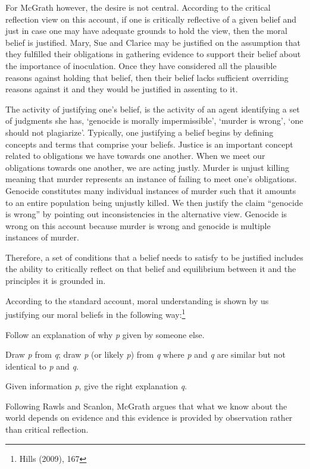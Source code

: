 \documentclass[
  letterpaper,
  DIV=11,
  numbers=noendperiod]{scrartcl}
\theoremstyle{remark}
\begin{document}
For McGrath however, the desire is not central. According to the
critical reflection view on this account, if one is critically
reflective of a given belief and just in case one may have adequate
grounds to hold the view, then the moral belief is justified. Mary, Sue
and Clarice may be justified on the assumption that they fulfilled their
obligations in gathering evidence to support their belief about the
importance of inoculation. Once they have considered all the plausible
reasons against holding that belief, then their belief lacks sufficient
overriding reasons against it and they would be justified in assenting
to it.

The activity of justifying one's belief, is the activity of an agent
identifying a set of judgments she has, `genocide is morally
impermissible', `murder is wrong', `one should not plagiarize'.
Typically, one justifying a belief begins by defining concepts and terms
that comprise your beliefs. Justice is an important concept related to
obligations we have towards one another. When we meet our obligations
towards one another, we are acting justly. Murder is unjust killing
meaning that murder represents an instance of failing to meet one's
obligations. Genocide constitutes many individual instances of murder
such that it amounts to an entire population being unjustly killed. We
then justify the claim ``genocide is wrong'' by pointing out
inconsistencies in the alternative view. Genocide is wrong on this
account because murder is wrong and genocide is multiple instances of
murder.

Therefore, a set of conditions that a belief needs to satisfy to be
justified includes the ability to critically reflect on that belief and
equilibrium between it and the principles it is grounded in.

According to the standard account, moral understanding is shown by us
justifying our moral beliefs in the following way:\footnote{Hills
  (2009), 167}

Follow an explanation of why \emph{p} given by someone else.

Draw \emph{p} from \emph{q}; draw \emph{p\textquotesingle{}} (or likely
\emph{p\textquotesingle{}}) from \emph{q\textquotesingle{}} where
\emph{p\textquotesingle{}} and \emph{q\textquotesingle{}} are similar
but not identical to \emph{p} and \emph{q}.

Given information \emph{p\textquotesingle{}}, give the right explanation
\emph{q\textquotesingle{}}.

Following Rawls and Scanlon, McGrath argues that what we know about the
world depends on evidence and this evidence is provided by observation
rather than critical reflection.
\end{document}
